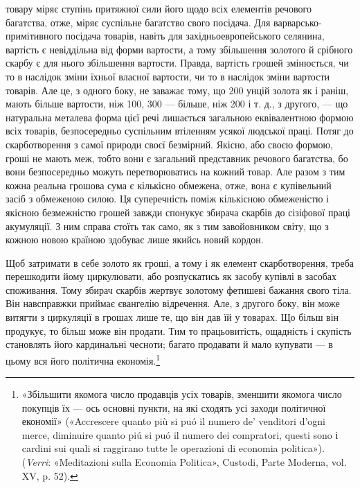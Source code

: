\parcont{}  %
товару міряє ступінь притяжної сили його щодо всіх елементів
речового багатства, отже, міряє суспільне багатство свого посідача.
Для варварсько-примітивного посідача товарів, навіть
для західньоевропейського селянина, вартість є невіддільна від
форми вартости, а тому збільшення золотого й срібного скарбу
є для нього збільшення вартости. Правда, вартість грошей змінюється,
чи то в наслідок зміни їхньої власної вартости, чи то
в наслідок зміни вартости товарів. Але це, з одного боку, не
заважає тому, що 200 унцій золота як і раніш, мають більше
вартости, ніж 100, 300 — більше, ніж 200 і т. д., з другого, —
що натуральна металева форма цієї речі лишається загальною
еквівалентною формою всіх товарів, безпосередньо суспільним
втіленням усякої людської праці. Потяг до скарботворення з
самої природи своєї безмірний. Якісно, або своєю формою, гроші
не мають меж, тобто вони є загальний представник речового
багатства, бо вони безпосередньо можуть перетворюватись на
кожний товар. Але разом з тим кожна реальна грошова сума є
кількісно обмежена, отже, вона є купівельний засіб з обмеженою
силою. Ця суперечність поміж кількісною обмеженістю і якісною
безмежністю грошей завжди спонукує збирача скарбів до сізіфової
праці акумуляції. З ним справа стоїть так само, як з
тим завойовником світу, що з кожною новою країною здобуває
лише якийсь новий кордон.

Щоб затримати в себе золото як гроші, а тому і як елемент
скарботворення, треба перешкодити йому циркулювати, або розпускатись
як засобу купівлі в засобах споживання. Тому збирач
скарбів жертвує золотому фетишеві бажання свого тіла.
Він навсправжки приймає євангелію відречення. Але, з другого
боку, він може витягти з циркуляції в грошах лише те, що він
дав їй у товарах. Що більш він продукує, то більш може він
продати. Тим то працьовитість, ощадність і скупість становлять
його кардинальні чесноти; багато продавати й мало купувати —
в цьому вся його політична економія.\footnote{«Збільшити якомога число продавців усіх товарів, зменшити якомога
число покупців їх — ось основні пункти, на які сходять усі заходи
політичної економії» («Accrescere quanto più si puó il numero de’ venditori
d’ogni merce, diminuire quanto piú si puó il numero dei compratori, questi
sono і cardini sui quali si raggirano tutte le operazioni di economia politica»).
(\emph{Verri}: «Meditazioni sulla Economia Politica», Custodi, Parte Moderna,
vol. XV, p. 52).}

